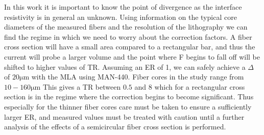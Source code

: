 In this work it is important to know the point of divergence as the interface resistivity is in general an unknown. Using information on the typical core diameters of the measured fibers and the resolution of the lithography we can find the regime in which we need to worry about the correction factors. A fiber cross section will have a small area compared to a rectangular bar, and thus the current will probe a larger volume and the point where F begins to fall off will be shifted to higher values of TR. Assuming an ER of 1, we can safely achieve a $\Delta$ of $20\si{\micro\meter}$ with the MLA using MAN-440. Fiber cores in the study range from  $10-160 \si{\micro\meter}$ This gives a TR between $0.5$ and $8$ which for a rectangular cross section is in the regime where the correction begins to become significant. Thus especially for the thinner fiber cores care must be taken to ensure a sufficiently larger ER, and measured values must be treated with caution until a further analysis of the effects of a semicircular fiber cross section is performed.  


\cleardoublepage
